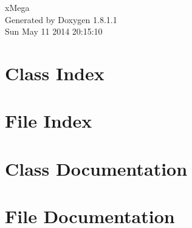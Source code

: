 \documentclass{book}
\begin{document}
\hypersetup{pageanchor=false,citecolor=blue}
\begin{titlepage}
\vspace*{7cm}
\begin{center}
{\Large x\-Mega }\\
\vspace*{1cm}
{\large Generated by Doxygen 1.8.1.1}\\
\vspace*{0.5cm}
{\small Sun May 11 2014 20:15:10}\\
\end{center}
\end{titlepage}
\clearemptydoublepage
{}
\tableofcontents
\clearemptydoublepage
{}
\hypersetup{pageanchor=true,citecolor=blue}
\chapter{Class Index}

\chapter{File Index}

\chapter{Class Documentation}





\chapter{File Documentation}





















\printindex
\end{document}

